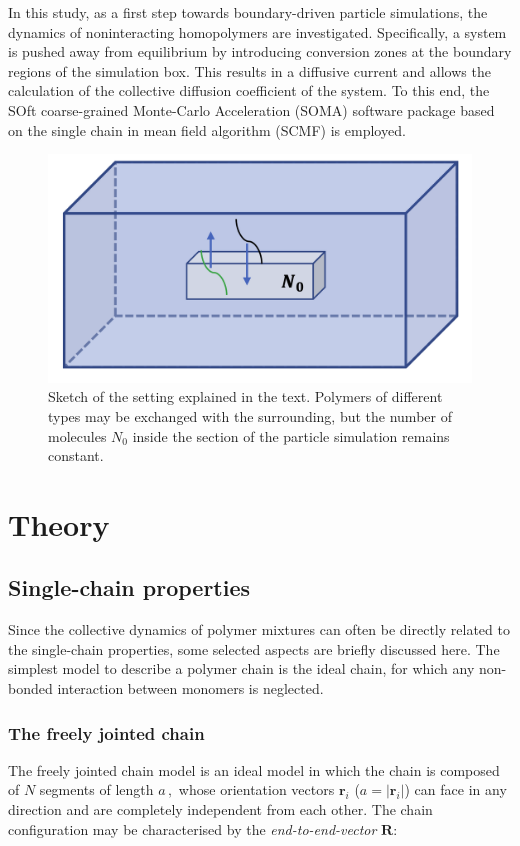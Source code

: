 \documentclass[bachelor,       %
               twoside,        %
               BCOR10mm,       %
               ngerman, english %
               ]{GAUBM}
\begin{document}
In this study, as a first step towards boundary-driven particle simulations, the dynamics of noninteracting homopolymers are investigated. Specifically, a system is pushed away from equilibrium by introducing conversion zones at the boundary regions of the simulation box. This results in a diffusive current and allows the calculation of the collective diffusion coefficient of the system. To this end, the SOft coarse-grained Monte-Carlo Acceleration (SOMA) \cite{Schneider_soma} software package based on the single chain in mean field algorithm (SCMF) \cite{Daoulas06} is employed.
\begin{figure}[h]
  \centering
  \includegraphics[width=0.6\linewidth]{figures/continuum_section.png}
  \caption{Sketch of the setting explained in the text. Polymers of different types may be exchanged with the surrounding, but the number of molecules $N_0$ inside the section of the particle simulation remains constant.}
  \label{fig:continuum_section}
\end{figure}



\chapter{Theory}

\section{Single-chain properties}

Since the collective dynamics of polymer mixtures can often be directly related to the single-chain properties, some selected aspects are briefly discussed here. The simplest model to describe a polymer chain is the ideal chain, for which any non-bonded interaction between monomers is neglected.
\subsection{The freely jointed chain}

The freely jointed chain model is an ideal model in which the chain is composed of $N$ segments of length $a\,,$ whose orientation vectors $\mathbf r_i$ ($a=|\mathbf r_i|$) can face in any direction and are completely independent from each other. The chain configuration may be characterised by the \textit{end-to-end-vector} $\mathbf R$:
\end{document}
